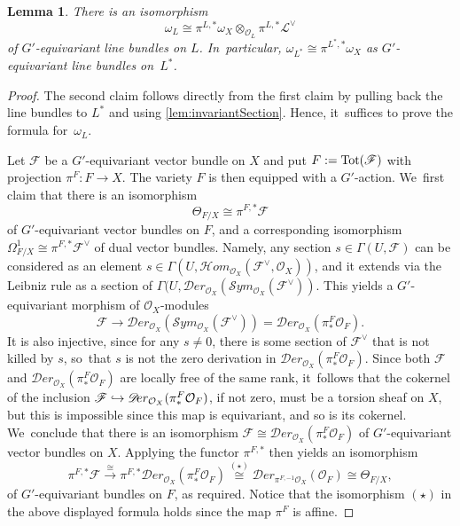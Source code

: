 \documentclass[JEP,XML,SOM,Unicode,published]{cedram}
\newcommand\hto{\mathrel{\lhook\joinrel\to}}
\newtheorem{lem}[thm]{Lemma}
\newcommand{\cD}{\mathscr{D}}
\newcommand{\Ell}{\mathscr{L}}
\newcommand{\cH}{\mathcal{H}}
\newcommand{\cO}{\mathcal{O}}\let\O\cO
\newcommand{\cS}{\mathcal{S}}
\begin{document}
\begin{lem} \label{lem:canonicalBundleOnL}
There is an isomorphism
\[
\omega_L \cong \pi^{L,*} \omega_X \otimes_{\O_L} \pi^{L,*} \Ell^\vee
\]
of $G'$-equivariant line bundles on $L$. In~particular,
$\omega_{L^*} \cong \pi^{L^*,*} \omega_X$
as $G'$-equivariant line bundles on~$L^*$.
\end{lem}

\begin{proof}
The second claim follows directly from the first claim by pulling back the line bundles to $L^*$ and using \cref{lem:invariantSection}. Hence, it~suffices to prove the formula for~$\omega_L$.

Let $\mathscr{F}$ be a $G'$-equivariant vector bundle on $X$ and put $F:=\textup{Tot}(\mathscr{F})$ with projection $\pi^F\colon F\to X$.
The variety $F$ is then equipped with a $G'$-action. We~first claim that there is an isomorphism
\[
\Theta_{F/X} \cong \pi^{F,*}\mathscr{F}
\]
of $G'$-equivariant vector bundles on $F$,
and a corresponding isomorphism $\Omega^1_{F/X}\cong \pi^{F,*}\mathscr{F}^\vee$ of dual vector bundles. Namely, any section $s\in\Gamma(U,\mathscr{F})$ can be
considered as an element $s\in \Gamma(U,{\cH\!}om_{\cO_X}(\mathscr{F}^\vee,\cO_X))$,
and it extends via the Leibniz rule as a section of
$\Gamma(U,{\cD\!}er_{\cO_X}({\cS\!}ym_{\cO_X}(\mathscr{F}^\vee))$. This yields a $G'$-equivariant morphism of $\cO_X$\nobreakdash-mod\-ules
\[
\mathscr{F} \to
{\cD\!}er_{\cO_X}({\cS\!}ym_{\cO_X}(\mathscr{F}^\vee))=
{\cD\!}er_{\cO_X}(\pi^F_*\cO_F).
\]
It is also injective,
since for any $s\neq 0$, there is some section of $\mathscr{F}^\vee$ that
is not killed by $s$, so~that $s$ is not the zero derivation in ${\cD\!}er_{\cO_X}(\pi^F_*\cO_F)$. Since both $\mathscr{F}$ and ${\cD\!}er_{\cO_X}(\pi^F_*\cO_F)$
are locally free of the same rank, it~follows that the cokernel of the inclusion
$\mathscr{F} \hto {\cD\!}er_{\cO_X}(\pi^F_*\cO_F)$, if not zero, must be a torsion sheaf on $X$, but this is impossible since this map is equivariant, and so is its cokernel. We~conclude that there is an isomorphism
$\mathscr{F} \cong {\cD\!}er_{\cO_X}(\pi^F_*\cO_F)$ of $G'$-equivariant vector bundles on $X$. Applying the functor $\pi^{F,*}$ then
yields an isomorphism
\[
\pi^{F,*}\mathscr{F} \stackrel{\cong}{\to} \pi^{F,*}
{\cD\!}er_{\cO_X}(\pi^F_*\cO_F) \stackrel{(\star)}{\cong}
{\cD\!}er_{\pi^{F,-1}\cO_X}(\cO_F) \cong \Theta_{F/X},
\]
of $G'$-equivariant bundles on $F$, as required. Notice that the isomorphism $(\star)$ in the above displayed formula holds since the map $\pi^F$ is affine.


\end{proof}
\end{document}
